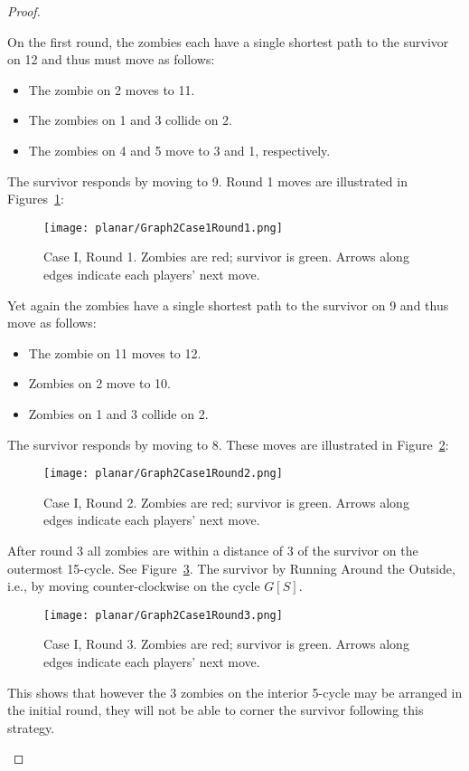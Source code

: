 \begin{proof}
\begin{enumerate}[I.]
On the first round, the zombies each have a single shortest path to the survivor on 12 and thus must move as follows:

\begin{itemize}
\item The zombie on 2 moves to 11.
\item The zombies on 1 and 3 collide on 2.
\item The zombies on 4 and 5 move to 3 and 1, respectively.
\end{itemize}

The survivor responds by moving to 9. Round 1 moves are illustrated in Figures~\ref{fig:planarG2C1R1}:
\begin{figure}
\centering
\texttt{[image: planar/Graph2Case1Round1.png]}
\caption{Case I, Round 1. Zombies are red; survivor is green. Arrows along edges indicate each players' next move.\label{fig:planarG2C1R1}}
\end{figure}

Yet again the zombies have a single shortest path to the survivor on 9 and thus move as follows:
\begin{itemize}
\item The zombie on 11 moves to 12.
\item Zombies on 2 move to 10.
\item Zombies on 1 and 3 collide on 2.
\end{itemize}

The survivor responds by moving to 8. These moves are illustrated in Figure~\ref{fig:planarG2C1R2}:
\begin{figure}
\centering
\texttt{[image: planar/Graph2Case1Round2.png]}
\caption{Case I, Round 2. Zombies are red; survivor is green. Arrows along edges indicate each players' next move.\label{fig:planarG2C1R2}}
\end{figure}

After round 3 all zombies are within a distance of 3 of the survivor on the outermost 15-cycle. See Figure~\ref{fig:planarG2C1R3}. The survivor by Running Around the Outside, i.e., by moving counter-clockwise on the cycle $G[S]$.

\begin{figure}
\centering
\texttt{[image: planar/Graph2Case1Round3.png]}
\caption{Case I, Round 3. Zombies are red; survivor is green. Arrows along edges indicate each players' next move.\label{fig:planarG2C1R3}}
\end{figure}

This shows that however the 3 zombies on the interior 5-cycle may be arranged in the initial round, they will not be able to corner the survivor following this strategy.


\end{enumerate}
\end{proof}
